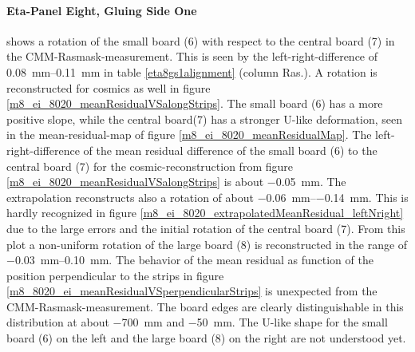 \documentclass[
twoside,            %
BCOR1.4cm,          %
10pt,               %
headings=normal,    %
headsepline,        %
clearplainpage,		%
final,              %
div=14,
open=right,
bibliography=toc
]{scrreprt}
\begin{document}
\newpage

\paragraph{Eta-Panel Eight, Gluing Side One}

shows a rotation of the small board (6) with respect to the central board (7) in the CMM-Rasmask-measurement.
This is seen by the left-right-difference of \SIrange{0.08}{0.11}{mm} in table \ref{eta8gs1alignment} (column Ras.).
A rotation is reconstructed for cosmics as well in figure \ref{m8_ei_8020_meanResidualVSalongStrips}. 
The small board (6) has a more positive slope, while the central board(7) has a stronger U-like deformation, seen in the mean-residual-map of figure \ref{m8_ei_8020_meanResidualMap}.
The left-right-difference of the mean residual difference of the small board (6) to the central board (7) for the cosmic-reconstruction from figure \ref{m8_ei_8020_meanResidualVSalongStrips} is about \SI{-0.05}{mm}.
The extrapolation reconstructs also a rotation of about \SIrange{-0.06}{-0.14}{mm}. 
This is hardly recognized in figure \ref{m8_ei_8020_extrapolatedMeanResidual_leftNright} due to the large errors and the initial rotation of the central board (7).
From this plot a non-uniform rotation of the large board (8) is reconstructed in the range of \SIrange{-0.03}{0.10}{mm}.
The behavior of the mean residual as function of the position perpendicular to the strips in figure \ref{m8_8020_ei_meanResidualVSperpendicularStrips} is unexpected from the CMM-Rasmask-measurement.
The board edges are clearly distinguishable in this distribution at about \SI{-700}{mm} and \SI{-50}{mm}.
The U-like shape for the small board (6) on the left and the large board (8) on the right are not understood yet.
\end{document}
